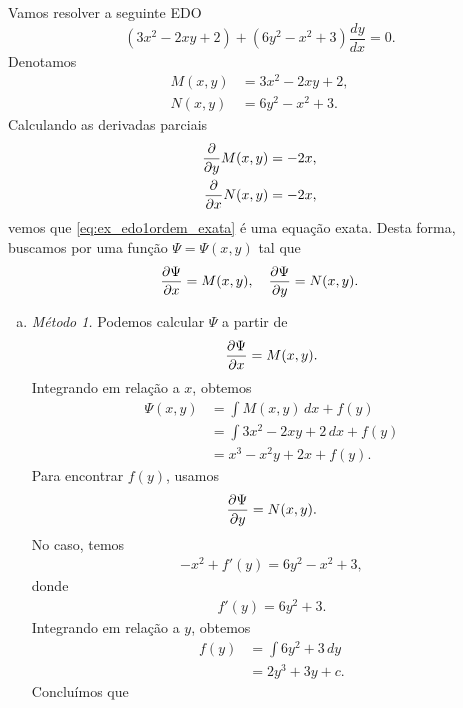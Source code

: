 \begin{ex}\label{ex:edo1ordem_exata}
  Vamos resolver a seguinte EDO
  \begin{equation}\label{eq:ex_edo1ordem_exata}
    (3x^2 - 2xy + 2) + (6y^2 - x^2 + 3)\frac{dy}{dx} = 0.
  \end{equation}
  Denotamos
  \begin{align}
    M(x,y) &= 3x^2 - 2xy + 2,\\
    N(x,y) &= 6y^2 - x^2 + 3.
  \end{align}
  Calculando as derivadas parciais
  \begin{align}
    \frac{\partial}{\partial y}M(x,y) = -2x, \\
    \frac{\partial}{\partial x}N(x,y) = -2x,
  \end{align}
  vemos que \eqref{eq:ex_edo1ordem_exata} é uma equação exata. Desta forma, buscamos por uma função $\Psi = \Psi(x,y)$ tal que
  \begin{equation}
    \frac{\partial\Psi}{\partial x} = M(x,y),\quad\frac{\partial\Psi}{\partial y} = N(x,y).
  \end{equation}
  \begin{enumerate}[a)]
  \item \emph{Método 1.}
    Podemos calcular $\Psi$ a partir de
    \begin{equation}
      \frac{\partial\Psi}{\partial x} = M(x,y).
    \end{equation}
    Integrando em relação a $x$, obtemos
    \begin{align}
      \Psi(x,y) &= \int M(x,y)\,dx + f(y)\\
                &= \int 3x^2-2xy+2\,dx + f(y) \\
                &= x^3-x^2y+2x + f(y).
    \end{align}
    Para encontrar $f(y)$, usamos
    \begin{equation}
      \frac{\partial\Psi}{\partial y} = N(x,y).
    \end{equation}
    No caso, temos
    \begin{align}
      -x^2 + f'(y) = 6y^2 - x^2 + 3,
    \end{align}
    donde
    \begin{align}
      f'(y) = 6y^2 + 3.
    \end{align}
    Integrando em relação a $y$, obtemos
    \begin{align}
      f(y) &= \int 6y^2 + 3\,dy \\
           &= 2y^3 + 3y + c.
    \end{align}
    Concluímos que
    \begin{equation}

\end{equation}
\end{enumerate}
\end{ex}
